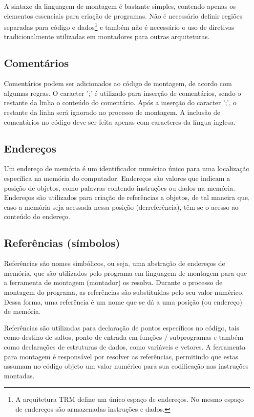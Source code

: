 \documentclass[11pt,a4paper]{report}
\begin{document}
A sintaxe da linguagem de montagem é bastante simples, contendo apenas
os elementos essenciais para criação de programas. Não é necessário
definir regiões separadas para código e dados\footnote{A arquitetura TRM
define um único espaço de endereços. No mesmo espaço de endereços
são armazenadas instruções e dados.} e também não é necessário o uso 
de diretivas tradicionalmente utilizadas em montadores para outras
arquiteturas.

\subsection{Comentários}

Comentários podem ser adicionados ao código de montagem, de acordo com
algumas regras. O caracter ';' é utilizado para inserção de comentários,
sendo o restante da linha o conteúdo do comentário. Após a inserção do
caracter ';', o restante da linha será ignorado no processo de montagem.
A inclusão de comentários no código deve ser feita apenas com caracteres
da língua inglesa.

\subsection{Endereços}

Um endereço de memória é um identificador numérico único para uma
localização específica na memória do computador. Endereços são valores
que indicam a posição de objetos, como palavras contendo instruções ou
dados na memória. Endereços são utilizados para criação de referências a
objetos, de tal maneira que, caso a memória seja acessada nessa posição
(derreferência), têm-se o acesso ao conteúdo do endereço. 

\subsection{Referências (símbolos)}

Referências são nomes simbólicos, ou seja, uma abstração de endereços
de memória, que são utilizados pelo programa em linguagem de montagem
para que a ferramenta de montagem (montador) os resolva. Durante o
processo de montagem do programa, as referências são substituídas pelo
seu valor numérico. Dessa forma, uma referência é um nome que se dá a
uma posição (ou endereço) de memória.

Referências são utilizadas para declaração de pontos específicos no código,
tais como destino de saltos, ponto de entrada em funções / subprogramas
e também como declarações de estruturas de dados, como variáveis e
vetores. A ferramenta para montagem é responsável por resolver as 
referências, permitindo que estas assumam no código objeto um valor
numérico para sua codificação nas instruções montadas.
\end{document}
